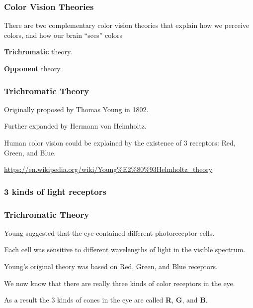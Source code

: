 \documentclass[12pt]{beamer}\usepackage[]{graphicx}\usepackage[]{color}
\begin{document}

\begin{frame}
\frametitle{Color Vision Theories}

There are two complementary color vision theories that explain how we perceive 
colors, and how our brain ``sees'' colors

\bi
  \item \textbf{Trichromatic} theory.
  \item \textbf{Opponent} theory.
\ei

\end{frame}


\begin{frame}
\begin{center}
\Huge{}
\end{center}
\end{frame}


\begin{frame}
\frametitle{Trichromatic Theory}

\bbi
  \item Originally proposed by Thomas Young in 1802.
  \item Further expanded by Hermann von Helmholtz.
  \item Human color vision could be explained by the existence of 3 receptors: 
  Red, Green, and Blue.
  \item {\scriptsize \url{https://en.wikipedia.org/wiki/Young\%E2\%80\%93Helmholtz_theory}}
\ei
\eb

\end{frame}


\begin{frame}
\frametitle{3 kinds of light receptors}
\begin{center}
\end{center}
\end{frame}


\begin{frame}
\frametitle{Trichromatic Theory}

\bbi
  \item Young suggested that the eye contained different photoreceptor cells.
  \item Each cell was sensitive to different wavelengths of light in the visible spectrum.
  \item Young's original theory was based on Red, Green, and Blue receptors.
  \item We now know that there are really three kinds of color receptors in the eye.
  \item As a result the 3 kinds of cones in the eye are called \textbf{R}, 
  \textbf{G}, and \textbf{B}.
\ei


\end{frame}
\end{document}
